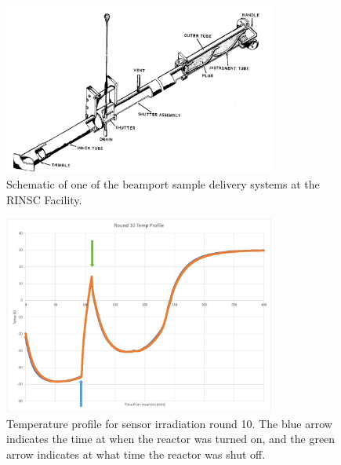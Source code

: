 \begin{figure}[!hbt]
  \begin{center}
    \includegraphics[width=0.80\textwidth]{figures/Beamport_Schematic}
    \caption{Schematic of one of the beamport sample delivery systems at the RINSC Facility.}
    \label{fig:Beamport_Schematic}
  \end{center}
\end{figure}

\begin{figure}[!hbt]
  \begin{center}
    \includegraphics[width=0.80\textwidth]{figures/Round_10_Temperature_Profile}
    \caption{Temperature profile for sensor irradiation round 10. The blue arrow indicates the time at when the reactor was turned on, and the green arrow indicates at what time the reactor was shut off.}
    \label{fig:Round_10_Temperature_Profile}
  \end{center}
\end{figure}

